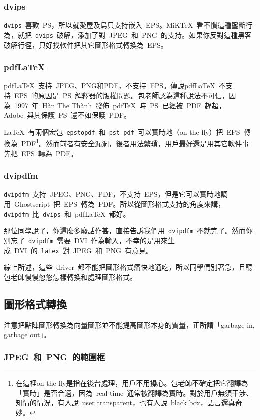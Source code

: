 \subsubsection{dvips}
\verb|dvips|~喜歡~PS，所以就愛屋及烏只支持嵌入~EPS。MiKTeX~看不慣這種壟斷行為，就把~\verb|dvips|~破解，添加了對~JPEG~和~PNG~的支持。如果你反對這種黑客破解行徑，只好找軟件把其它圖形格式轉換為~EPS。

\subsubsection{pdf\LaTeX}
pdf\LaTeX~支持~JPEG、PNG和PDF，不支持~EPS。傳說pdf\LaTeX~不支持~EPS~的原因是~PS~解釋器的版權問題。包老師認為這種說法不可信，因為~1997~年~Hàn The Thành~發佈~pdf\TeX~時~PS~已經被~PDF~趕超，Adobe~與其保護~PS~還不如保護~PDF。

\LaTeX~有兩個宏包~\verb|epstopdf|~和~\verb|pst-pdf|~可以實時地（on the fly）把~EPS~轉換為~PDF\footnote{在這裡on the fly是指在後台處理，用戶不用操心。包老師不確定把它翻譯為「實時」是否合適，因為~real time~通常被翻譯為實時。對於用戶無須干涉、知情的情況，有人說~user transparent，也有人說~black box，語言還真奇妙。}。然而前者有安全漏洞，後者用法繁瑣，用戶最好還是用其它軟件事先把~EPS~轉為~PDF。

\subsubsection{dvipdfm}
\verb|dvipdfm|~支持~JPEG、PNG、PDF，不支持~EPS，但是它可以實時地調用~Ghostscript~把~EPS~轉為~PDF。所以從圖形格式支持的角度來講，\verb|dvipdfm|~比~\verb|dvips|~和~pdf\LaTeX~都好。

那位同學說了，你這麼多廢話作甚，直接告訴我們用~\verb|dvipdfm|~不就完了。然而你別忘了~\verb|dvipdfm|~需要~DVI~作為輸入，不幸的是用來生成~DVI~的~\verb|latex|~對~JPEG~和~PNG~有意見。

綜上所述，這些~driver~都不能把圖形格式痛快地通吃，所以同學們別著急，且聽包老師慢慢忽悠怎樣轉換和處理圖形格式。

\subsection{圖形格式轉換}

注意把點陣圖形轉換為向量圖形並不能提高圖形本身的質量，正所謂「garbage in, garbage out」。

\subsubsection{JPEG~和~PNG~的範圍框}

